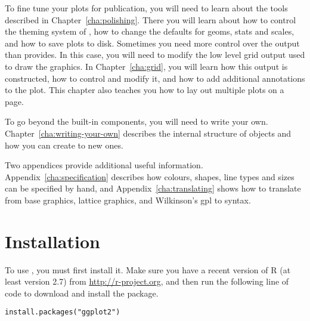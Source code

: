 To fine tune your plots for publication, you will need to learn about the tools described in Chapter~\ref{cha:polishing}.  There you will learn about how to control the theming system of \ggplot, how to change the defaults for geoms, stats and scales, and how to save plots to disk.  Sometimes you need more control over the output than \ggplot provides.  In this case, you will need to modify the low level grid output used to draw the graphics.  In Chapter~\ref{cha:grid}, you will learn how this output is constructed, how to control and modify it, and how to add additional annotations to the plot.  This chapter also teaches you how to lay out multiple plots on a page.

To go beyond the built-in components, you will need to write your own. Chapter~\ref{cha:writing-your-own} describes the internal structure of \ggplot objects and how you can create to new ones.

Two appendices provide additional useful information.  Appendix~\ref{cha:specification} describes how colours, shapes, line types and sizes can be specified by hand, and Appendix~\ref{cha:translating} shows how to translate from base graphics, lattice graphics, and Wilkinson's {\sc gpl} to \ggplot syntax.

\section{Installation}\label{sub:installation}

To use \ggplot, you must first install it. Make sure you have a recent version of R (at least version 2.7) from \url{http://r-project.org}, and then run the following line of code to download and install the \ggplot package.  

\begin{verbatim}
install.packages("ggplot2")
\end{verbatim}

% 
% 
% 

